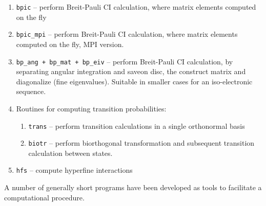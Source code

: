 \documentclass[fleqn,10pt]{book}
\begin{document}
\begin{enumerate}
\item {\tt bpic}      -- perform Breit-Pauli CI calculation, where matrix elements computed on the fly
\item {\tt bpic\_mpi}      -- perform Breit-Pauli CI calculation, where matrix elements computed on the fly, MPI version.
\item {\tt bp\_ang + bp\_mat + bp\_eiv}      -- perform Breit-Pauli CI calculation, by separating angular integration and saveon disc, the construct matrix and diagonalize (fine eigenvalues). Suitable in smaller cases for an iso-electronic sequence.

\item Routines for computing transition probabilities:
\begin{enumerate}
\item  {\tt trans}     -- perform transition calculations in a single
 orthonormal basis 
\item {\tt biotr} -- perform biorthogonal transformation and subsequent transition calculation 
between states.
\end{enumerate}

\item {\tt hfs}      -- compute hyperfine interactions 

  \end{enumerate}

A number of generally 
short programs have been developed as tools to facilitate a computational
procedure. 
\end{document}
